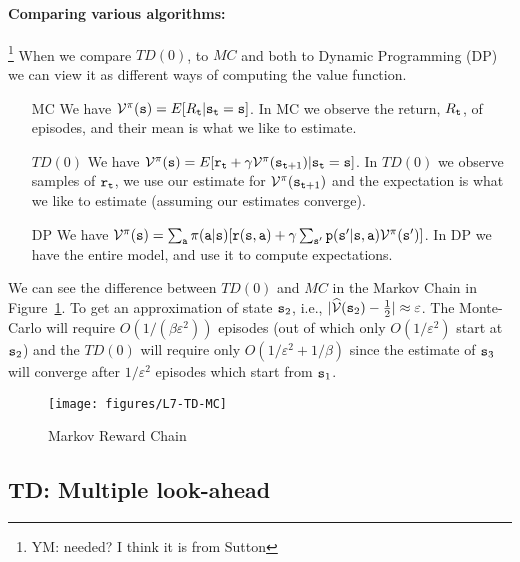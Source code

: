 \paragraph{Comparing various algorithms:}\footnote{YM: needed? I think it is from Sutton}
When we compare $TD(0)$, to $MC$ and both to  Dynamic Programming
(DP) we can view it as different ways of computing the value
function.
\begin{itemize}
\item[MC] We have $\mathcal{V}^\pi({\tt s})=E[R_{\tt t}|{\tt s}_{\tt t}={\tt s}]$. In MC we observe the
return, $R_{\tt t}$, of episodes, and their mean is what we like to
estimate.
\item [$TD(0)$]  We have $\mathcal{V}^\pi({\tt s})=E[{\tt r}_{\tt t}+\gamma \mathcal{V}^\pi({\tt s}_{{\tt t}+1})|{\tt s}_{\tt t}={\tt s}]$. In $TD(0)$ we observe samples of
${\tt r}_{\tt t}$, we use our estimate for
$\mathcal{V}^\pi({\tt s}_{{\tt t}+1})$ and the expectation is what we
like to estimate (assuming our estimates converge).
\item
[DP]
 We have $\mathcal{V}^\pi({\tt s})=\sum_{{\tt a}}\pi({\tt a}|{\tt s})[{\tt r}({\tt s},{\tt a})+\gamma \sum_{{\tt s}'}{\tt p}({\tt s}'|{\tt s},{\tt a})\mathcal{V}^\pi({\tt s}')]$. In DP we
 have the entire model, and use it to compute expectations.
\end{itemize}

We can see the difference between $TD(0)$ and $MC$ in the Markov
Chain in Figure~\ref{fig:L7-TD-MC}. To get an approximation of state
${\tt s}_2$, i.e., $|\widehat{\mathcal{V}}({\tt s}_2)-\frac{1}{2}|\approx
\varepsilon$. The Monte-Carlo will require $O(1/(\beta
\varepsilon^2))$ episodes (out of which only $O(1/\varepsilon^2)$
start at ${\tt s}_2$) and the $TD(0)$ will require only
$O(1/\varepsilon^2+1/\beta)$ since the estimate of ${\tt s}_3$ will
converge after $1/\varepsilon^2$ episodes which start from
${\tt s}_1$.

\begin{figure}
  \begin{centering}
  \texttt{[image: figures/L7-TD-MC]}\\
  \caption{Markov Reward Chain}\label{fig:L7-TD-MC}
  \end{centering}
\end{figure}

\subsection{TD: Multiple look-ahead}

